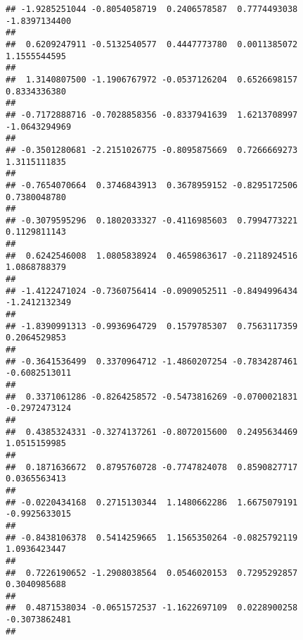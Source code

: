 \documentclass[]{article}
\begin{document}
\begin{verbatim}
## -1.9285251044 -0.8054058719  0.2406578587  0.7774493038 -1.8397134400 
##                                                                       
##  0.6209247911 -0.5132540577  0.4447773780  0.0011385072  1.1555544595 
##                                                                       
##  1.3140807500 -1.1906767972 -0.0537126204  0.6526698157  0.8334336380 
##                                                                       
## -0.7172888716 -0.7028858356 -0.8337941639  1.6213708997 -1.0643294969 
##                                                                       
## -0.3501280681 -2.2151026775 -0.8095875669  0.7266669273  1.3115111835 
##                                                                       
## -0.7654070664  0.3746843913  0.3678959152 -0.8295172506  0.7380048780 
##                                                                       
## -0.3079595296  0.1802033327 -0.4116985603  0.7994773221  0.1129811143 
##                                                                       
##  0.6242546008  1.0805838924  0.4659863617 -0.2118924516  1.0868788379 
##                                                                       
## -1.4122471024 -0.7360756414 -0.0909052511 -0.8494996434 -1.2412132349 
##                                                                       
## -1.8390991313 -0.9936964729  0.1579785307  0.7563117359  0.2064529853 
##                                                                       
## -0.3641536499  0.3370964712 -1.4860207254 -0.7834287461 -0.6082513011 
##                                                                       
##  0.3371061286 -0.8264258572 -0.5473816269 -0.0700021831 -0.2972473124 
##                                                                       
##  0.4385324331 -0.3274137261 -0.8072015600  0.2495634469  1.0515159985 
##                                                                       
##  0.1871636672  0.8795760728 -0.7747824078  0.8590827717  0.0365563413 
##                                                                       
## -0.0220434168  0.2715130344  1.1480662286  1.6675079191 -0.9925633015 
##                                                                       
## -0.8438106378  0.5414259665  1.1565350264 -0.0825792119  1.0936423447 
##                                                                       
##  0.7226190652 -1.2908038564  0.0546020153  0.7295292857  0.3040985688 
##                                                                       
##  0.4871538034 -0.0651572537 -1.1622697109  0.0228900258 -0.3073862481 
##                                                                       

\end{verbatim}
\end{document}
